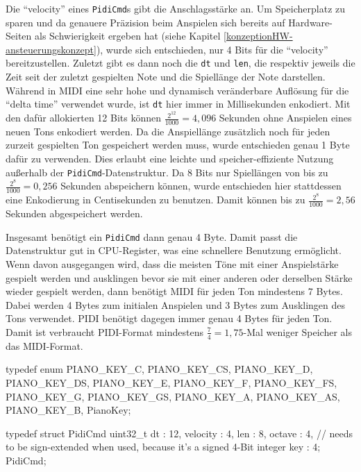 Die \enquote{velocity} eines \lstinline{PidiCmd}s gibt die Anschlagsstärke an.
Um Speicherplatz zu sparen und da genauere Präzision beim Anspielen sich bereits auf Hardware-Seiten als Schwierigkeit ergeben hat (siehe Kapitel \ref{konzeptionHW-ansteuerungskonzept}), wurde sich entschieden, nur 4 Bits für die \enquote{velocity} bereitzustellen.
Zuletzt gibt es dann noch die \lstinline{dt} und \lstinline{len}, die respektiv jeweils die Zeit seit der zuletzt gespielten Note und die Spiellänge der Note darstellen.
Während in \ac{MIDI} eine sehr hohe und dynamisch veränderbare Auflösung für die \enquote{delta time} verwendet wurde, ist \lstinline{dt} hier immer in Millisekunden enkodiert.
Mit den dafür allokierten 12 Bits können $\frac{2^{12}}{1000} = 4,096$ Sekunden ohne Anspielen eines neuen Tons enkodiert werden.
Da die Anspiellänge zusätzlich noch für jeden zurzeit gespielten Ton gespeichert werden muss, wurde entschieden genau 1 Byte dafür zu verwenden.
Dies erlaubt eine leichte und speicher-effiziente Nutzung außerhalb der \lstinline{PidiCmd}-Datenstruktur.
Da 8 Bits nur Spiellängen von bis zu $\frac{2^8}{1000} = 0,256$ Sekunden abspeichern können, wurde entschieden hier stattdessen eine Enkodierung in Centisekunden zu benutzen.
Damit können bis zu $\frac{2^8}{1000} = 2,56$ Sekunden abgespeichert werden.

Insgesamt benötigt ein \lstinline{PidiCmd} dann genau 4 Byte.
Damit passt die Datenstruktur gut in CPU-Register, was eine schnellere Benutzung ermöglicht.
Wenn davon ausgegangen wird, dass die meisten Töne mit einer Anspielstärke gespielt werden und ausklingen bevor sie mit einer anderen oder derselben Stärke wieder gespielt werden, dann benötigt \ac{MIDI} für jeden Ton mindestens 7 Bytes.
Dabei werden 4 Bytes zum initialen Anspielen und 3 Bytes zum Ausklingen des Tons verwendet.
\ac{PIDI} benötigt dagegen immer genau 4 Bytes für jeden Ton.
Damit ist verbraucht \ac{PIDI}-Format mindestens $\frac{7}{4} = 1,75$-Mal weniger Speicher als das \ac{MIDI}-Format.

\begin{UnbrokenCodePage}[style=CStyle, caption={Definition eines \ac{PIDI}-Kommands}, label={code:PidiCmd struct}]
typedef enum {
    PIANO_KEY_C,
    PIANO_KEY_CS,
    PIANO_KEY_D,
    PIANO_KEY_DS,
    PIANO_KEY_E,
    PIANO_KEY_F,
    PIANO_KEY_FS,
    PIANO_KEY_G,
    PIANO_KEY_GS,
    PIANO_KEY_A,
    PIANO_KEY_AS,
    PIANO_KEY_B,
} PianoKey;

typedef struct PidiCmd {
    uint32_t dt : 12,
    velocity    : 4,
    len         : 8,
    octave      : 4, // needs to be sign-extended when used, because it's a signed 4-Bit integer
    key         : 4;
} PidiCmd;
\end{UnbrokenCodePage}



